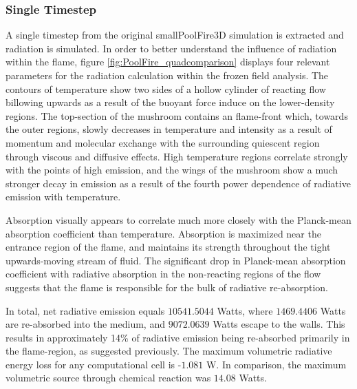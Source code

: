 \subsubsection{Single Timestep}
A single timestep from the original smallPoolFire3D simulation is extracted and radiation is simulated.
In order to better understand the influence of radiation within the flame, figure \ref{fig:PoolFire_quadcomparison} displays four relevant parameters for the radiation calculation within the frozen field analysis. 
The contours of temperature show two sides of a hollow cylinder of reacting flow billowing upwards as a result of the buoyant force induce on the lower-density regions.
The top-section of the mushroom contains an  flame-front which, towards the outer regions, slowly decreases in temperature and intensity as a result of momentum and molecular exchange with the surrounding quiescent region through viscous and diffusive effects.
High temperature regions correlate strongly with the points of high emission, and the wings of the mushroom show a much stronger decay in emission as a result of the fourth power dependence of radiative emission with temperature.

Absorption visually appears to correlate much more closely with the Planck-mean absorption coefficient than temperature. Absorption is maximized near the entrance region of the flame, and maintains its strength throughout the tight upwards-moving stream of fluid.
The significant drop in Planck-mean absorption coefficient with radiative absorption in the non-reacting regions of the flow suggests that the flame is responsible for the bulk of radiative re-absorption. 

In total, net radiative emission equals $10541.5044$ Watts, where $1469.4406$ Watts are re-absorbed into the medium, and $9072.0639$ Watts escape to the walls. This results in approximately 14\% of radiative emission being re-absorbed primarily in the flame-region, as suggested previously. 
The maximum volumetric radiative energy loss for any computational cell is -$1.081$ W. In comparison, the maximum volumetric source through chemical reaction was $14.08$ Watts.


